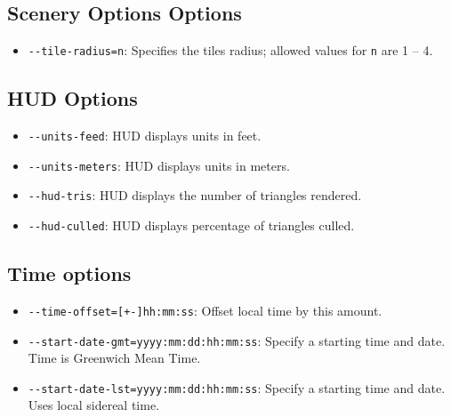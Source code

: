 \subsection{Scenery Options Options}

\begin{itemize}

\item{\texttt{-$\!$-tile-radius=n}}: Specifies the tiles radius; allowed values for
\texttt{n} are 1 -- 4.

\end{itemize}

\subsection{HUD Options}

\begin{itemize}

\item{\texttt{-$\!$-units-feed}}: HUD displays units in feet.

\item{\texttt{-$\!$-units-meters}}: HUD displays units in meters.

\item{\texttt{-$\!$-hud-tris}}: HUD displays the number of triangles rendered.

\item{\texttt{-$\!$-hud-culled}}: HUD displays percentage of triangles culled.

\end{itemize}

\subsection{Time options}

\begin{itemize}

\item{\texttt{-$\!$-time-offset=[+-]hh:mm:ss}}: Offset local time by this amount.

\item{\texttt{-$\!$-start-date-gmt=yyyy:mm:dd:hh:mm:ss}}: Specify a starting time and
date. Time is Greenwich Mean Time.

\item{\texttt{-$\!$-start-date-lst=yyyy:mm:dd:hh:mm:ss}}: Specify a starting time and
date. Uses local sidereal time.

\end{itemize}

